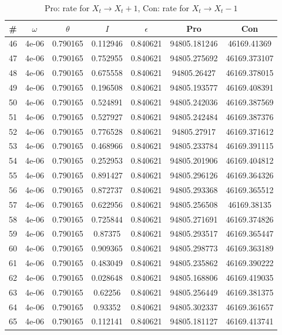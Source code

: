 \newpage
\begin{table}
\caption{Pro: rate for $X_t \rightarrow X_t + 1$, Con: rate for $X_t \rightarrow X_t - 1$}
\begin{tabular*}{\linewidth}{c|c|c|c|c|c|c}
\# & $\omega$ & $\theta$ & $I$ & $\epsilon$ & Pro & Con \\
\hline
46 & 4e-06 & 0.790165 & 0.112946 & 0.840621 & 94805.181246 & 46169.41369\\
47 & 4e-06 & 0.790165 & 0.752955 & 0.840621 & 94805.275692 & 46169.373107\\
48 & 4e-06 & 0.790165 & 0.675558 & 0.840621 & 94805.26427 & 46169.378015\\
49 & 4e-06 & 0.790165 & 0.196508 & 0.840621 & 94805.193577 & 46169.408391\\
50 & 4e-06 & 0.790165 & 0.524891 & 0.840621 & 94805.242036 & 46169.387569\\
51 & 4e-06 & 0.790165 & 0.527927 & 0.840621 & 94805.242484 & 46169.387376\\
52 & 4e-06 & 0.790165 & 0.776528 & 0.840621 & 94805.27917 & 46169.371612\\
53 & 4e-06 & 0.790165 & 0.468966 & 0.840621 & 94805.233784 & 46169.391115\\
54 & 4e-06 & 0.790165 & 0.252953 & 0.840621 & 94805.201906 & 46169.404812\\
55 & 4e-06 & 0.790165 & 0.891427 & 0.840621 & 94805.296126 & 46169.364326\\
56 & 4e-06 & 0.790165 & 0.872737 & 0.840621 & 94805.293368 & 46169.365512\\
57 & 4e-06 & 0.790165 & 0.622956 & 0.840621 & 94805.256508 & 46169.38135\\
58 & 4e-06 & 0.790165 & 0.725844 & 0.840621 & 94805.271691 & 46169.374826\\
59 & 4e-06 & 0.790165 & 0.87375 & 0.840621 & 94805.293517 & 46169.365447\\
60 & 4e-06 & 0.790165 & 0.909365 & 0.840621 & 94805.298773 & 46169.363189\\
61 & 4e-06 & 0.790165 & 0.483049 & 0.840621 & 94805.235862 & 46169.390222\\
62 & 4e-06 & 0.790165 & 0.028648 & 0.840621 & 94805.168806 & 46169.419035\\
63 & 4e-06 & 0.790165 & 0.62256 & 0.840621 & 94805.256449 & 46169.381375\\
64 & 4e-06 & 0.790165 & 0.93352 & 0.840621 & 94805.302337 & 46169.361657\\
65 & 4e-06 & 0.790165 & 0.112141 & 0.840621 & 94805.181127 & 46169.413741\\

\end{tabular*}
\end{table}
